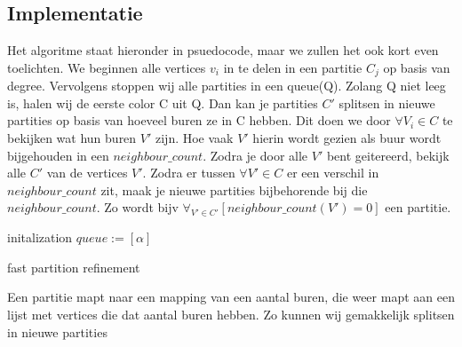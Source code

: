 \documentclass[twoside]{article}
\begin{document}
\begin{multicols}{2}
\section{Implementatie}
Het algoritme staat hieronder in psuedocode, maar we zullen het ook kort even toelichten. We beginnen alle vertices $v_i$ in te delen in een partitie $C_j$ op basis van degree. Vervolgens stoppen wij alle partities in een queue(Q).
Zolang Q niet leeg is, halen wij de eerste color C uit Q. 
Dan kan je partities $ C' $ splitsen in nieuwe partities op basis van hoeveel buren ze in C hebben. Dit doen we door $ \forall V_i \in C $ te bekijken wat hun buren $V'$ zijn. Hoe vaak $V'$ hierin wordt  gezien als buur wordt bijgehouden in een $neighbour\_count$. Zodra je door alle $V'$ bent geitereerd, bekijk alle $C'$ van de vertices $V'$. Zodra er tussen $ \forall{V'} \in C $ er een verschil in $neighbour\_count$ zit, maak je nieuwe partities bijbehorende bij die $neighbour\_count$. Zo wordt bijv $ \forall_{V' \in C'}  [ neighbour\_count(V') = 0] $ een partitie.

\begin{algorithm}[H]
initalization \;
 $queue := [\alpha]$\;

 \caption{fast partition refinement}
\end{algorithm}
\pagebreak

\begin{algorithm}[H]
Een partitie mapt naar een mapping van een aantal buren, die weer mapt aan een lijst met vertices die dat aantal buren hebben. Zo kunnen wij gemakkelijk splitsen in nieuwe partities \;



\end{algorithm}
\end{multicols}
\end{document}
